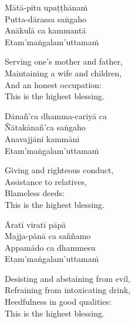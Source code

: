 \ifbfive\clearpage\fi

\begin{pali-hang-continued}
  Mātā-pitu upaṭṭhānaṁ\\
  Putta-dārassa saṅgaho\\
  Anākulā ca kammantā\\
  Etam'maṅgalam'uttamaṁ
\end{pali-hang-continued}

\ifafive\clearpage\fi

\begin{english-verses}
  Serving one's mother and father,\\
  Maintaining a wife and children,\\
  And an honest occupation:\\
  This is the highest blessing.
\end{english-verses}

\begin{pali-hang-continued}
  Dānañ'ca dhamma-cariyā ca\\
  Ñātakānañ'ca saṅgaho\\
  Anavajjāni kammāni\\
  Etam'maṅgalam'uttamaṁ
\end{pali-hang-continued}

\ifninebythirteen\clearpage\fi

\begin{english-verses}
  Giving and righteous conduct,\\
  Assistance to relatives,\\
  Blameless deeds:\\
  This is the highest blessing.
\end{english-verses}

\begin{pali-hang-continued}
  Āratī viratī pāpā\\
  Majja-pānā ca saññamo\\
  Appamādo ca dhammesu\\
  Etam'maṅgalam'uttamaṁ
\end{pali-hang-continued}

\begin{english-verses}
  Desisting and abstaining from evil,\\
  Refraining from intoxicating drink,\\
  Heedfulness in good qualities:\\
  This is the highest blessing.
\end{english-verses}

